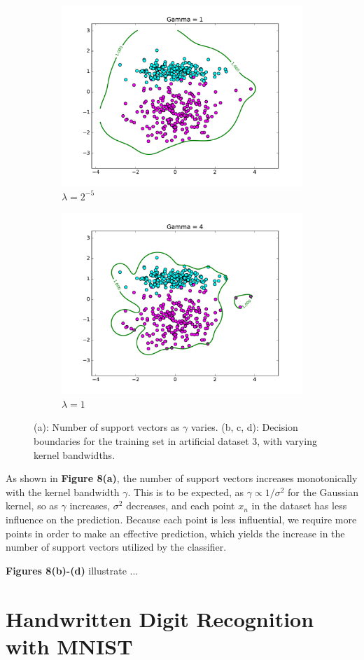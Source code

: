 \documentclass[10pt,psamsfonts]{amsart}
\theoremstyle{definition}
\theoremstyle{remark}
\numberwithin{equation}{section}
\begin{document}
\begin{figure}[b]
\begin{subfigure}[b]{0.23\textwidth}
		\includegraphics[width=\textwidth]{hw2_3-4_2.pdf}
		\caption{$\lambda = 2^{-5}$}
	\end{subfigure}
	\begin{subfigure}[b]{0.23\textwidth}
		\includegraphics[width=\textwidth]{hw2_3-4_4.pdf}
		\caption{$\lambda = 1$}
	\end{subfigure}
	\caption{(a): Number of support vectors as $\gamma$ varies. (b, c, d): Decision boundaries for the training set in artificial dataset 3, with varying kernel bandwidths.}
\end{figure}

As shown in {\bf Figure 8(a)}, the number of support vectors increases monotonically with the kernel bandwidth $\gamma$. This is to be expected, as $\gamma \propto 1/\sigma^2$ for the Gaussian kernel, so as $\gamma$ increases, $\sigma^2$ decreases, and each point $x_n$ in the dataset has less influence on the prediction. Because each point is less influential, we require more points in order to make an effective prediction, which yields the increase in the number of support vectors utilized by the classifier.

{\bf Figures 8(b)-(d)} illustrate ... 

\section{Handwritten Digit Recognition with MNIST}
\end{document}
